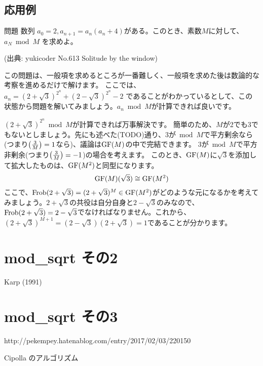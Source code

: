 \documentclass{jsarticle}
\begin{document}
  \subsection{応用例}
  \begin{itembox}[l]{問題}
   数列 $a_0 = 2, a_{n+1} = a_n(a_n+4)$がある。このとき、素数$M$に対して、$a_N \bmod M$ を求めよ。

   (出典: yukicoder No.613 Solitude by the window)
  \end{itembox}
  この問題は、一般項を求めるところが一番難しく、一般項を求めた後は数論的な考察を進めるだけで解けます。
  ここでは、$a_n = (2+\sqrt{3})^{2^n} + (2-\sqrt{3})^{2^n} - 2$ であることがわかっているとして、この状態から問題を解いてみましょう。$a_n \bmod M$が計算できれば良いです。

  $(2+\sqrt{3})^{2^n} \bmod M$が計算できれば万事解決です。
  簡単のため、$M$が2でも3でもないとしましょう。先にも述べた(TODO)通り、3が${}\bmod M$で平方剰余なら(つまり$\left(\frac{3}{M}\right)=1$なら)、議論は$\mathrm{GF}(M)$の中で完結できます。
  3が${}\bmod M$で平方非剰余(つまり$\left(\frac{3}{M}\right)=-1$)の場合を考えます。
  このとき、$\mathrm{GF}(M)$に$\sqrt{3}$を添加して拡大したものは、$\mathrm{GF}(M^2)$と同型になります。
  \begin{displaymath}
   \mathrm{GF}(M)(\sqrt{3}) \cong \mathrm{GF}(M^2)
  \end{displaymath}
  ここで、$\mathrm{Frob}(2+\sqrt{3}) = (2+\sqrt{3})^M \in \mathrm{GF}(M^2)$がどのような元になるかを考えてみましょう。$2+\sqrt{3}$の共役は自分自身と$2-\sqrt{3}$のみなので、$\mathrm{Frob}(2+\sqrt{3})=2-\sqrt{3}$でなければなりません。これから、$(2+\sqrt{3})^{M+1}=(2-\sqrt{3})(2+\sqrt{3})=1$であることが分かります。
 \section{mod\_sqrt その2}
 Karp (1991)~\cite{Karp1991}
 \section{mod\_sqrt その3}
 http://pekempey.hatenablog.com/entry/2017/02/03/220150

 Cipolla のアルゴリズム
\end{document}
